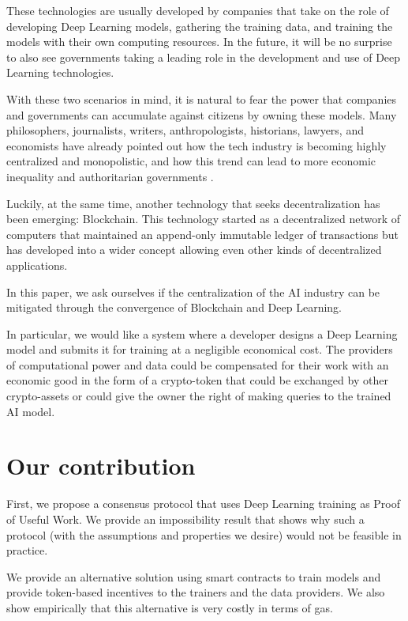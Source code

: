 \documentclass[conference]{IEEEtran}
\begin{document}
These technologies are usually developed by companies that take on the role of developing Deep Learning models, gathering the training data, and training the models with their own computing resources. In the future, it will be no surprise to also see governments taking a leading role in the development and use of Deep Learning technologies.

With these two scenarios in mind, it is natural to fear the power that companies and governments can accumulate against citizens by owning these models. Many philosophers, journalists, writers, anthropologists, historians, lawyers, and economists have already pointed out how the tech industry is becoming highly centralized and monopolistic, and how this trend can lead to more economic inequality and authoritarian governments \cite{b1} \cite{b2} \cite{b3} \cite{b4}.

Luckily, at the same time, another technology that seeks decentralization has been emerging: Blockchain. This technology started as a decentralized network of computers that maintained an append-only immutable ledger of transactions \cite{b6} but has developed into a wider concept allowing even other kinds of decentralized applications.

In this paper, we ask ourselves if the centralization of the AI industry can be mitigated through the convergence of Blockchain and Deep Learning.

In particular, we would like a system where a developer designs a Deep Learning model and submits it for training at a negligible economical cost. The providers of computational power and data could be compensated for their work with an economic good in the form of a crypto-token that could be exchanged by other crypto-assets or could give the owner the right of making queries to the trained AI model.

\section{Our contribution}
First, we propose a consensus protocol that uses Deep Learning training as Proof of Useful Work. We provide an impossibility result that shows why such a protocol (with the assumptions and properties we desire) would not be feasible in practice.

We provide an alternative solution using smart contracts to train models and provide token-based incentives to the trainers and the data providers. We also show empirically that this alternative is very costly in terms of gas.
\end{document}
